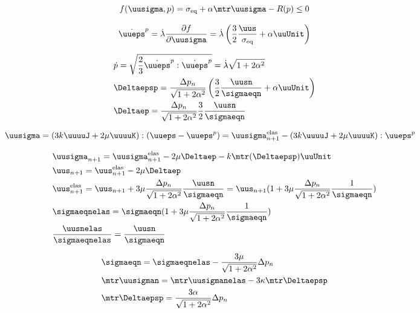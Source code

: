 \documentclass[12pt]{article}
\begin{document}
\begin{equation}
    f(\uusigma, p) = \sigma_{\text{eq}} + \alpha \mtr \uusigma - R(p) \leq 0
\end{equation}

\begin{equation}
    \dot{\uueps}^p = \dot{\lambda} \frac{\partial f}{\partial \uusigma} = \dot{\lambda} \left(\frac{3}{2} \frac{\uus}{\sigma_\text{eq}} + \alpha \uuUnit \right)
\end{equation}

\begin{align}
    & \dot{p} = \sqrt{\frac{2}{3} \dot{\uueps}^p : \dot{\uueps}^p} = \dot{\lambda}\sqrt{1 + 2\alpha^2} \\
    & \Deltaepsp = \frac{\Delta p_n}{\sqrt{1 + 2\alpha^2}} \left( \frac{3}{2} \frac{\uusn}{\sigmaeqn} + \alpha \uuUnit \right) \\
    & \Deltaep = \frac{\Delta p_n}{\sqrt{1 + 2\alpha^2}} \frac{3}{2} \frac{\uusn}{\sigmaeqn} 
\end{align}

\begin{align}
    & \uusigma = (3k\uuuuJ + 2\mu\uuuuK) : (\uueps - \uueps^p) = \uusigma_{n+1}^\text{elas} - (3k\uuuuJ + 2\mu\uuuuK) : \uueps^p
\end{align}

\begin{align}
    & \uusigma_{n+1} = \uusigma_{n+1}^\text{elas} - 2\mu \Deltaep - k \mtr (\Deltaepsp) \uuUnit \\
    & \uus_{n+1} = \uus_{n+1}^\text{elas} - 2\mu\Deltaep \\
    & \uus_{n+1}^\text{elas} = \uus_{n+1} + 3\mu\frac{\Delta p_n}{\sqrt{1 + 2\alpha^2}} \frac{\uusn}{\sigmaeqn} = \uus_{n+1} (1 +  3\mu\frac{\Delta p_n}{\sqrt{1 + 2\alpha^2}} \frac{1}{\sigmaeqn}) \\
    & \sigmaeqnelas = \sigmaeqn (1 +  3\mu\frac{\Delta p_n}{\sqrt{1 + 2\alpha^2}} \frac{1}{\sigmaeqn}) \\
    & \frac{\uusnelas}{\sigmaeqnelas} = \frac{\uusn}{\sigmaeqn}
\end{align}

\begin{align}
    & \sigmaeqn = \sigmaeqnelas - \frac{3\mu}{\sqrt{1 + 2\alpha^2}}\Delta p_n \\
    & \mtr \uusigman = \mtr \uusigmanelas - 3\kappa \mtr \Deltaepsp \\
    & \mtr \Deltaepsp = \frac{3\alpha}{\sqrt{1 + 2\alpha^2}} \Delta p_n
\end{align}
\end{document}
